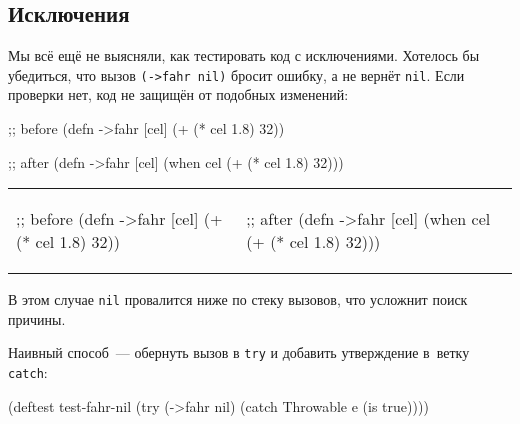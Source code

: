 \subsection{Исключения}


Мы всё ещё не выясняли, как тестировать код с исключениями. Хотелось бы
убедиться, что вызов \verb|(->fahr nil)| бросит ошибку, а не вернёт
\verb|nil|. Если проверки нет, код не защищён от подобных изменений:

\ifx\devicetype\mobile

\begin{english}
  \begin{clojure}
;; before
(defn ->fahr [cel]
  (+ (* cel 1.8) 32))
  \end{clojure}

\splitter

  \begin{clojure}
;; after
(defn ->fahr [cel]
  (when cel
    (+ (* cel 1.8) 32)))
  \end{clojure}
\end{english}

\else

\begin{english}

\noindent
\begin{tabular}{ @{}p{5cm} @{}p{5cm} }


  \begin{clojure}
;; before
(defn ->fahr [cel]
  (+ (* cel 1.8) 32))
  \end{clojure}

&

  \begin{clojure}
;; after
(defn ->fahr [cel]
  (when cel
    (+ (* cel 1.8) 32)))
  \end{clojure}

\end{tabular}

\end{english}

\fi


\noindent
В этом случае \verb|nil| провалится ниже по стеку вызовов, что усложнит поиск
причины.

Наивный способ~--- обернуть вызов в \verb|try| и добавить утверждение в~ветку
\verb|catch|:

\begin{english}
  \begin{clojure}
(deftest test-fahr-nil
  (try
    (->fahr nil)
    (catch Throwable e
      (is true))))
  \end{clojure}
\end{english}

